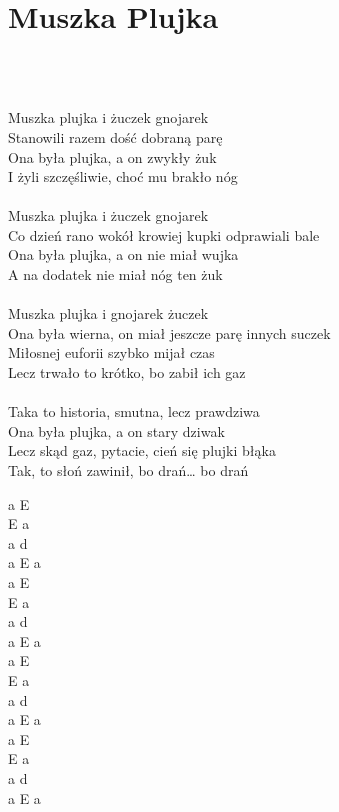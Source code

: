 \documentclass[a5paper, 10pt]{book}
\begin{document}
\section{Muszka Plujka}\textcolor{lightgray}{\textit{}}\\~\\
\begin{minipage}[t]{0.8\textwidth}
  Muszka plujka i żuczek gnojarek 					\\
  Stanowili razem dość dobraną parę					\\
  Ona była plujka, a on zwykły żuk					\\
  I żyli szczęśliwie, choć mu brakło nóg				\\
  \\
  Muszka plujka i żuczek gnojarek\\
  Co dzień rano wokół krowiej kupki odprawiali bale\\
  Ona była plujka, a on nie miał wujka\\
  A na dodatek nie miał nóg ten żuk\\
  \\
  Muszka plujka i gnojarek żuczek\\
  Ona była wierna, on miał jeszcze parę innych suczek\\
  Miłosnej euforii szybko mijał czas\\
  Lecz trwało to krótko, bo zabił ich gaz\\
  \\
  Taka to historia, smutna, lecz prawdziwa\\
  Ona była plujka, a on stary dziwak\\
  Lecz skąd gaz, pytacie, cień się plujki błąka\\
  Tak, to słoń zawinił, bo drań… bo drań\\
\end{minipage}
\begin{minipage}[t]{0.2\textwidth}
  a E \\
  E a \\
  a d \\
  a E a\\

  a E \\
  E a \\
  a d \\
  a E a\\

  a E \\
  E a \\
  a d \\
  a E a\\

  a E \\
  E a \\
  a d \\
  a E a\\
\end{minipage}
\end{document}
